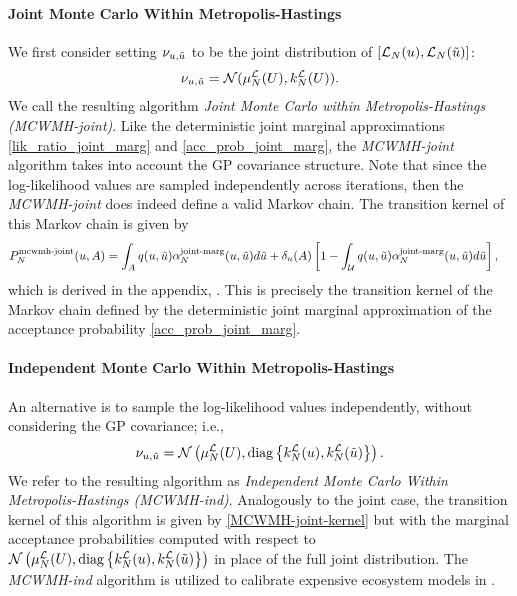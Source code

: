 \documentclass[12pt]{article}
\begin{document}
\paragraph{Joint Monte Carlo Within Metropolis-Hastings}
We first consider setting $\llikSampDist_{\Par, \propPar}$ to be the joint distribution of 
$[\llikEm[\Ndesign](\Par), \llikEm[\Ndesign](\propPar)]$: 
\begin{align}
\llikSampDist_{\Par, \propPar} = \Gaussian(\emMean[\Ndesign]{\llik}(\parMat), \emKer[\Ndesign]{\llik}(\parMat)).
\label{llik_dist_MCWMH-joint}
\end{align}
We call the resulting algorithm \textit{Joint Monte Carlo within Metropolis-Hastings (MCWMH-joint)}. 
Like the deterministic joint marginal approximations \ref{lik_ratio_joint_marg} and \ref{acc_prob_joint_marg}, 
the \textit{MCWMH-joint} algorithm takes into account the GP covariance structure. Note that since the log-likelihood
values are sampled independently across iterations, then the \textit{MCWMH-joint} does indeed define a valid 
Markov chain. The transition kernel of this Markov chain is given by 
\begin{align}
\llikEmJointMCWMH[\Ndesign]{\MarkovKernel}(\Par, A) 
&= \int_{A} \propDens(\Par, \propPar) \llikEmJointMarg[\Ndesign]{\accProbMH}(\Par, \propPar) d\propPar 
+ \delta_{\Par}(A) \left[1 - \int_{\parSpace} \propDens(\Par, \propPar) \llikEmJointMarg[\Ndesign]{\accProbMH}(\Par, \propPar) d\propPar \right],
\label{MCWMH-joint-kernel}
\end{align}
which is derived in the appendix, . This is precisely the transition kernel of the Markov chain 
defined by the deterministic joint marginal approximation of the acceptance probability \ref{acc_prob_joint_marg}. 

\paragraph{Independent Monte Carlo Within Metropolis-Hastings}
An alternative is to sample the log-likelihood values independently, without considering the GP covariance; i.e., 
\begin{align}
\llikSampDist_{\Par, \propPar} 
= \Gaussian\left(\emMean[\Ndesign]{\llik}(\parMat), \text{diag}\left\{\emKer[\Ndesign]{\llik}(\Par), \emKer[\Ndesign]{\llik}(\propPar)\right\}\right).
\label{llik_dist_MCWMH-ind}
\end{align}
We refer to the resulting algorithm as \textit{Independent Monte Carlo Within Metropolis-Hastings (MCWMH-ind)}. Analogously to the 
joint case, the transition kernel of this algorithm is given by \ref{MCWMH-joint-kernel} but with the marginal acceptance probabilities computed
with respect to $\Gaussian\left(\emMean[\Ndesign]{\llik}(\parMat), \text{diag}\left\{\emKer[\Ndesign]{\llik}(\Par), \emKer[\Ndesign]{\llik}(\propPar)\right\}\right)$
in place of the full joint distribution. The \textit{MCWMH-ind} algorithm is utilized to calibrate expensive ecosystem models 
in \cite{FerEmulation}. 
\end{document}
